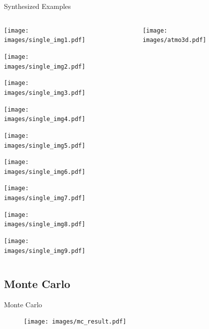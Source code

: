 \documentclass[compress,red,12pt]{beamer}
\begin{document}
\begin{frame}{Synthesized Examples}
  \begin{columns}[C]
    \begin{column}{.7\textwidth}
      \begin{overlayarea}{\columnwidth}{8cm}
        {\centerline{\texttt{[image: images/single\_img1.pdf]}}}
        {\centerline{\texttt{[image: images/single\_img2.pdf]}}}
        {\centerline{\texttt{[image: images/single\_img3.pdf]}}}
        {\centerline{\texttt{[image: images/single\_img4.pdf]}}}
        {\centerline{\texttt{[image: images/single\_img5.pdf]}}}
        {\centerline{\texttt{[image: images/single\_img6.pdf]}}}
        {\centerline{\texttt{[image: images/single\_img7.pdf]}}}
        {\centerline{\texttt{[image: images/single\_img8.pdf]}}}
        {\centerline{\texttt{[image: images/single\_img9.pdf]}}}
      \end{overlayarea}
    \end{column}
    \begin{column}{.3\textwidth}
      \begin{figure}
        \centering
        \texttt{[image: images/atmo3d.pdf]}
      \end{figure}
    \end{column}
  \end{columns}
\end{frame}


\subsection{Monte Carlo}

\begin{frame}{Monte Carlo}
  \begin{figure}
    \centering
    \begin{overprint}
      {\centerline{\def\svgwidth{0.5\linewidth}\small{}}}
      {\centerline{\texttt{[image: images/mc\_result.pdf]}}}
      {\centerline{\def\svgwidth{0.5\linewidth}\small{}}}
    \end{overprint}
  \end{figure}
\end{frame}
\end{document}
